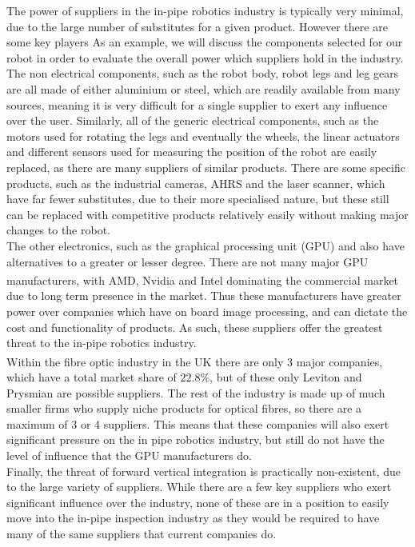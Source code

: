 \documentclass[11pt]{article}		%
\begin{document}
			The power of suppliers in the in-pipe robotics industry is typically very minimal, due to the large number of substitutes for a given product.
			However there are some key players
			As an example, we will discuss the components selected for our robot in order to evaluate the overall power which suppliers hold in the industry.
			\\
			The non electrical components, such as the robot body, robot legs and leg gears are all made of either aluminium or steel, which are readily available from many sources, meaning it is very difficult for a single supplier to exert any influence over the user.
			Similarly, all of the generic electrical components, such as the motors used for rotating the legs and eventually the wheels, the linear actuators and different sensors used for measuring the position of the robot are easily replaced, as there are many suppliers of similar products.
			There are some specific products, such as the industrial cameras, AHRS and the laser scanner, which have far fewer substitutes, due to their more specialised nature, but these still can be replaced with competitive products relatively easily without making major changes to the robot.
			\\
			The other electronics, such as the graphical processing unit (GPU) and  also have alternatives to a greater or lesser degree.
			There are not many major GPU manufacturers, with AMD, Nvidia and Intel dominating the commercial market \textsuperscript{\cite{rake2020graphic}} due to long term presence in the market.
			Thus these manufacturers have greater power over companies which have on board image processing, and can dictate the cost and functionality of  products.
			As such, these suppliers offer the greatest threat to the in-pipe robotics industry.
			\\
			Within the fibre optic industry in the UK there are only 3 major companies\textsuperscript{\cite{neve2020fibreoptic}}, which have a total market share of $22.8$\%, but of these only Leviton and Prysmian are possible suppliers.
			The rest of the industry is made up of much smaller firms who supply niche products for optical fibres, so there are a maximum of 3 or 4 suppliers.
			This means that these companies will also exert significant pressure on the in pipe robotics industry, but still do not have the level of influence that the GPU manufacturers do.
			\\
			Finally, the threat of forward vertical integration is practically non-existent, due to the large variety of suppliers.
			While there are a few key suppliers who exert significant influence over the industry, none of these are in a position to easily move into the in-pipe inspection industry as they would be required to have many of the same suppliers that current companies do.
					
\end{document}
